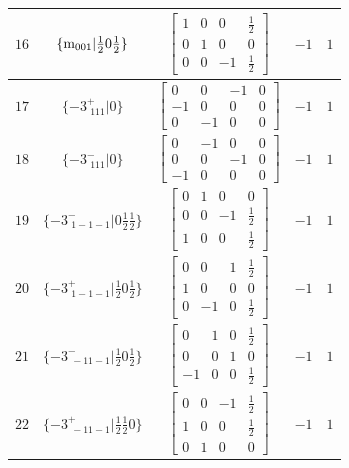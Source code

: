 \documentclass[fleqn,8pt]{jsarticle}
\begin{document}
\begin{longtable}{ccccc}
$ 16 $ & $ \{{\rm m}_{001}|\frac{1}{2} 0 \frac{1}{2}\} $ & $ \begin{bmatrix} 1 & 0 & 0 & \frac{1}{2} \\ 0 & 1 & 0 & 0 \\ 0 & 0 & -1 & \frac{1}{2} \end{bmatrix} $ & $ -1 $ & $ 1 $ \\ \hline
$ 17 $ & $ \{-3^{+}_{\,\,111}|0\} $ & $ \begin{bmatrix} 0 & 0 & -1 & 0 \\ -1 & 0 & 0 & 0 \\ 0 & -1 & 0 & 0 \end{bmatrix} $ & $ -1 $ & $ 1 $ \\ \hline
$ 18 $ & $ \{-3^{-}_{\,\,111}|0\} $ & $ \begin{bmatrix} 0 & -1 & 0 & 0 \\ 0 & 0 & -1 & 0 \\ -1 & 0 & 0 & 0 \end{bmatrix} $ & $ -1 $ & $ 1 $ \\ \hline
$ 19 $ & $ \{-3^{-}_{\,\,1-1-1}|0 \frac{1}{2} \frac{1}{2}\} $ & $ \begin{bmatrix} 0 & 1 & 0 & 0 \\ 0 & 0 & -1 & \frac{1}{2} \\ 1 & 0 & 0 & \frac{1}{2} \end{bmatrix} $ & $ -1 $ & $ 1 $ \\ \hline
$ 20 $ & $ \{-3^{+}_{\,\,1-1-1}|\frac{1}{2} 0 \frac{1}{2}\} $ & $ \begin{bmatrix} 0 & 0 & 1 & \frac{1}{2} \\ 1 & 0 & 0 & 0 \\ 0 & -1 & 0 & \frac{1}{2} \end{bmatrix} $ & $ -1 $ & $ 1 $ \\ \hline
$ 21 $ & $ \{-3^{-}_{\,\,-11-1}|\frac{1}{2} 0 \frac{1}{2}\} $ & $ \begin{bmatrix} 0 & 1 & 0 & \frac{1}{2} \\ 0 & 0 & 1 & 0 \\ -1 & 0 & 0 & \frac{1}{2} \end{bmatrix} $ & $ -1 $ & $ 1 $ \\ \hline
$ 22 $ & $ \{-3^{+}_{\,\,-11-1}|\frac{1}{2} \frac{1}{2} 0\} $ & $ \begin{bmatrix} 0 & 0 & -1 & \frac{1}{2} \\ 1 & 0 & 0 & \frac{1}{2} \\ 0 & 1 & 0 & 0 \end{bmatrix} $ & $ -1 $ & $ 1 $ \\ \hline

\end{longtable}
\end{document}

